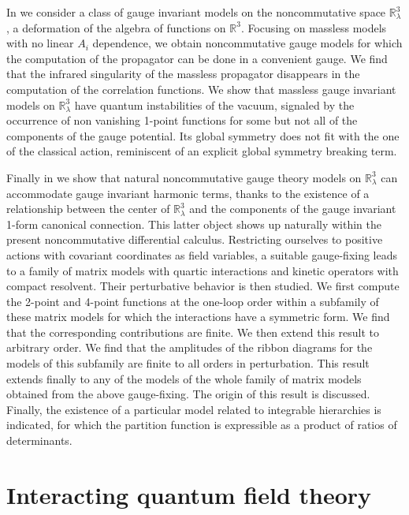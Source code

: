 \documentclass[11pt]{book}
\theoremstyle{break}
\begin{document}
In \cite{GVW_2014} we consider a  class of gauge invariant models on the noncommutative space $\mathbb{R}^3_\lambda$, a deformation of the algebra of functions on $\mathbb{R}^3$. Focusing on massless models with no linear $A_i$ dependence, we obtain noncommutative gauge models for which the computation of the propagator can be done in a convenient gauge. We find that the infrared singularity of the massless propagator disappears in the computation of the correlation functions. We show that massless gauge invariant models on $\mathbb{R}^3_\lambda$ have quantum instabilities of the vacuum, signaled by the occurrence of non vanishing 1-point functions for some but not all of the components of the gauge potential. Its global symmetry does not fit with the one of the classical action, reminiscent of an explicit global symmetry breaking term.\par%


Finally in \cite{GJW_2015} we show that natural noncommutative gauge theory models on $\mathbb{R}^3_\lambda$ can accommodate gauge invariant harmonic terms, thanks to the existence of a relationship between the center of $\mathbb{R}^3_\lambda$ and the components of the gauge invariant 1-form canonical connection. This latter object shows up naturally within the present noncommutative differential calculus. Restricting ourselves to positive actions with covariant coordinates as field variables, a suitable gauge-fixing leads to a family of matrix models with quartic interactions and kinetic operators with compact resolvent. Their perturbative behavior is then studied. We first compute the 2-point and 4-point functions at the one-loop order within a subfamily of these matrix models for which the interactions have a symmetric form. We find that the corresponding contributions are finite. We then extend this result to arbitrary order. We find that the amplitudes of the ribbon diagrams for the models of this subfamily are finite to all orders in perturbation. This result extends finally to any of the models of the whole family of matrix models obtained from the above gauge-fixing. The origin of this result is discussed. Finally, the existence of a particular model related to integrable hierarchies is indicated, for which the partition function is expressible as a product of ratios of determinants.\par%


\chapter{Interacting quantum field theory}
\label{p:PAQFT}
\end{document}

